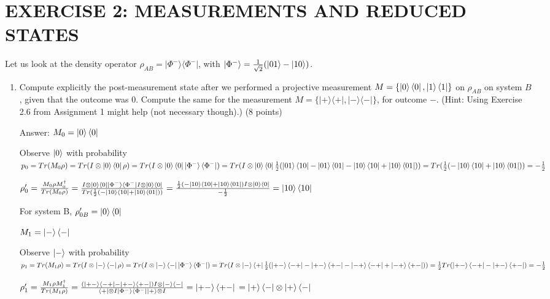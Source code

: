 \documentclass{article}
\begin{document}
\section{EXERCISE 2: MEASUREMENTS AND REDUCED STATES}
Let us look at the density operator $\rho_{AB} = |\Phi^{-}\rangle\langle\Phi^{-}|$, with $|\Phi^{-}\rangle = \frac{1}{\sqrt{2}}(\ket{01} - \ket{10})$.

\begin{enumerate}
    \item Compute explicitly the post-measurement state after we performed a projective measurement $M = \{\ket{0}\bra{0},\ket{1}\bra{1}\}$ on $\rho_{AB}$ on system $B$, given that the outcome was $0$. Compute the same for the measurement $M = \{|+\rangle\langle+|, |-\rangle\langle-|\}$, for outcome $-$. (Hint: Using Exercise 2.6 from Assignment 1 might help (not necessary though).) (8 points)

          Answer: $M_0=\ket{0}\bra{0}$

          Observe $\ket{0}$ with probability $p_0=Tr(M_0\rho)=Tr(I\otimes \ket{0}\bra{0}\rho)=Tr(I\otimes \ket{0}\bra{0}\ket{\Phi^{-}}\bra{\Phi^{-}})=Tr(I\otimes \ket{0}\bra{0}\frac{1}{2}(\ket{01}\bra{10}-\ket{01}\bra{01}-\ket{10}\bra{10}+\ket{10}\bra{01}))=Tr(\frac{1}{2}(-\ket{10}\bra{10}+\ket{10}\bra{01}))=-\frac{1}{2}$

          $\rho_0'=\frac{M_0\rho M_0^{\dagger}}{Tr(M_0\rho)}
              \\=\frac{I\otimes \ket{0}\bra{0}\ket{\Phi^{-}}\bra{\Phi^{-}}I\otimes \ket{0}\bra{0}}{Tr(\frac{1}{2}(-\ket{10}\bra{10}+\ket{10}\bra{01}))}
              \\=\frac{\frac{1}{2}(-\ket{10}\bra{10}+\ket{10}\bra{01})I\otimes \ket{0}\bra{0}}{-\frac{1}{2}}
              \\=\ket{10}\bra{10}
          $

          For system B, $\rho_{0B}'=\ket{0}\bra{0}$


          $M_1=\ket{-}\bra{-}$

          Observe $\ket{-}$ with probability $p_1=Tr(M_1\rho)=Tr(I\otimes \ket{-}\bra{-}\rho)=Tr(I\otimes \ket{-}\bra{-}\ket{\Phi^{-}}\bra{\Phi^{-}})=
              Tr(I\otimes \ket{-}\bra{+}\frac{1}{2}(\ket{+-}\bra{-+}-\ket{+-}\bra{+-}-\ket{-+}\bra{-+}+\ket{-+}\bra{+-}))
              \\=\frac{1}{2}Tr(\ket{+-}\bra{-+}-\ket{+-}\bra{+-})=-\frac{1}{2}
          $

          $\rho_1'=\frac{M_1\rho M_1^{\dagger}}{Tr(M_1\rho)}
              \\=\frac{(\ket{+-}\bra{-+}-\ket{+-}\bra{+-})I\otimes \ket{-}\bra{-}}{\bra{+}\otimes I\ket{\Phi^-}\bra{\Phi^-}\ket{+}\otimes I}
              \\=\ket{+-}\bra{+-}
              \\=\ket{+}\bra{-}\otimes\ket{+}\bra{-}
          $


\end{enumerate}
\end{document}
